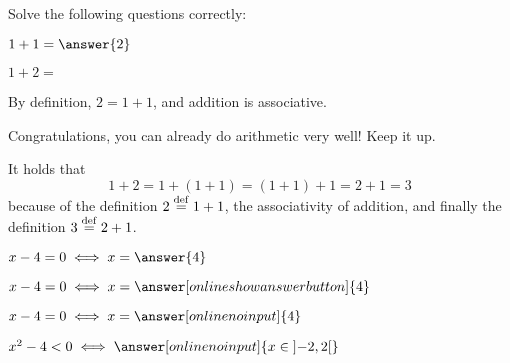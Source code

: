 \documentclass{ximera}
\begin{document}

    \begin{exercise} Solve the following questions correctly:
        \begin{question}
                $1+1 = \answer{2}$
        \end{question}    
        \begin{question}
            $1+2 = $ 
            \begin{hint}
                By definition, $2 = 1+1$, and addition is associative.
            \end{hint}
            \begin{feedback}[correct] 
                Congratulations, you can already do arithmetic very well! Keep it up. 
            \end{feedback}         
            \begin{oplossing} It holds that
                \[ 1 + 2 = 1 + (1 + 1) = (1 + 1) + 1 = 2 + 1 = 3 \]
                because of the definition $2\overset{\mathrm{def}}{=} 1+1$, the associativity of addition,
                and finally the definition $3\overset{\mathrm{def}}{=} 2+1$. 
            \end{oplossing}
        \end{question}

        \begin{question}$x-4 = 0
            \iff x = \answer{4}$
        \end{question}
        \begin{question}$x-4 = 0
            \iff x = \answer[onlineshowanswerbutton]{4}$
        \end{question}
        \begin{question}$x-4 = 0
            \iff x = \answer[onlinenoinput]{4}$
        \end{question}
        \begin{question}$x^2-4 < 0
            \iff \answer[onlinenoinput]{ x \in \left]-2,2\right[}$
        \end{question}

    \end{exercise}
\end{document}
